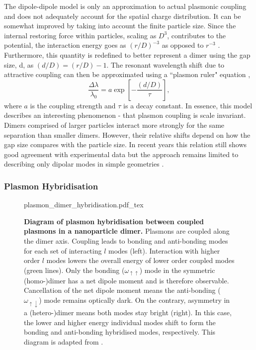 \documentclass{article}
\begin{document}
The dipole-dipole model is only an approximation to actual plasmonic coupling and does not adequately account for the spatial charge distribution. It can be somewhat improved by taking into account the finite particle size. Since the internal restoring force within particles, scaling as $D^3$, contributes to the potential, the interaction energy goes as $(r/D)^{-3}$ as opposed to $r^{-3}$ \cite{jain2007}. Furthermore, this quantity is redefined to better represent a dimer using the gap size, \gls{d}, as $(d/D) = (r/D)-1$. The resonant wavelength shift due to attractive coupling can then be approximated using a ``plasmon ruler" equation \cite{jain2007, ben2011},
\begin{equation}
	\frac{\Delta\lambda}{\lambda_0} = a\exp{\left[-\frac{(d/D)}{\tau}\right]},
	\label{eq:plasmon_ruler}
\end{equation}
where $a$ is the coupling strength and $\tau$ is a decay constant. In essence, this model describes an interesting phenomenon - that plasmon coupling is scale invariant. Dimers comprised of larger particles interact more strongly for the same separation than smaller dimers. However, their relative shifts depend on how the gap size compares with the particle size. In recent years this relation still shows good agreement with experimental data but the approach remains limited to describing only dipolar modes in simple geometries \cite{muskens2007}.

\FloatBarrier
\subsubsection{Plasmon Hybridisation}

\begin{figure}[bt]
\centering
\fontsize{10pt}{1em}\selectfont
\def\svgwidth{0.98\textwidth}
{plasmon_dimer_hybridisation.pdf_tex}
\caption[Diagram of plasmon hybridisation between coupled plasmons in a nanoparticle dimer]{\textbf{Diagram of plasmon hybridisation between coupled plasmons in a nanoparticle dimer.} Plasmons are coupled along the dimer axis. Coupling leads to bonding and anti-bonding modes for each set of interacting $l$ modes (left). Interaction with higher order $l$ modes lowers the overall energy of lower order coupled modes (green lines). Only the bonding ($\omega_{\uparrow\uparrow}$) mode in the symmetric (homo-)dimer has a net dipole moment and is therefore observable. Cancellation of the net dipole moment means the anti-bonding ($\omega_{\uparrow\downarrow}$) mode remains optically dark. On the contrary, asymmetry in a (hetero-)dimer means both modes stay bright (right). In this case, the lower and higher energy individual modes shift to form the bonding and anti-bonding hybridised modes, respectively. This diagram is adapted from \cite{nordlander2004}.}
\label{fig:plasmon_hybridisation}
\end{figure}
\end{document}
